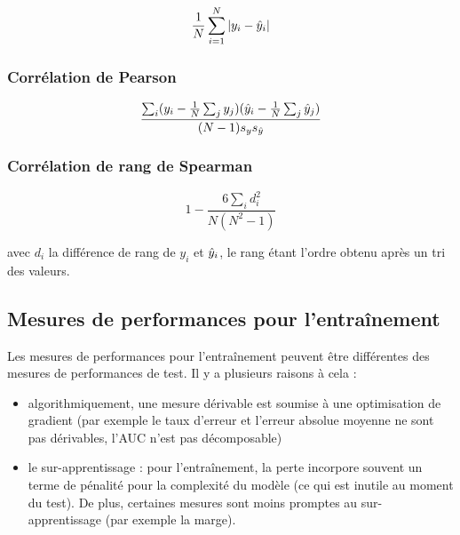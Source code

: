 		$$\frac{1}{N} \sum_{i = 1}^N \vert y_i - \hat{y}_i \vert$$
		
		\subsubsection{Corrélation de Pearson}
		
		$$\frac{\sum_i (y_i - \frac{1}{N} \sum_j y_j)(\hat{y}_i - \frac{1}{N} \sum_j \hat{y}_j)}{(N - 1)s_y s_{\hat{y}} }$$
		 		
		\subsubsection{Corrélation de rang de Spearman}
		
		$$1 - \frac{6 \sum_i d_i^2}{N(N^2 - 1)}$$
		
		avec $d_i$ la différence de rang de $y_i$ et $\hat{y}_i$, le rang étant l'ordre obtenu après un tri des valeurs.
		
	\subsection{Mesures de performances pour l'entraînement}
	
	Les mesures de performances pour l'entraînement peuvent être différentes des mesures de performances de test. Il y a plusieurs raisons à cela :
	
	\begin{itemize}
		\item algorithmiquement, une mesure dérivable est soumise à une optimisation de gradient (par exemple le taux d'erreur et l'erreur absolue moyenne ne sont pas dérivables, l'AUC n'est pas décomposable)
		\item le sur-apprentissage : pour l'entraînement, la perte incorpore souvent un terme de pénalité pour la complexité du modèle (ce qui est inutile au moment du test). De plus, certaines mesures sont moins promptes au sur-apprentissage (par exemple la marge).
	\end{itemize}